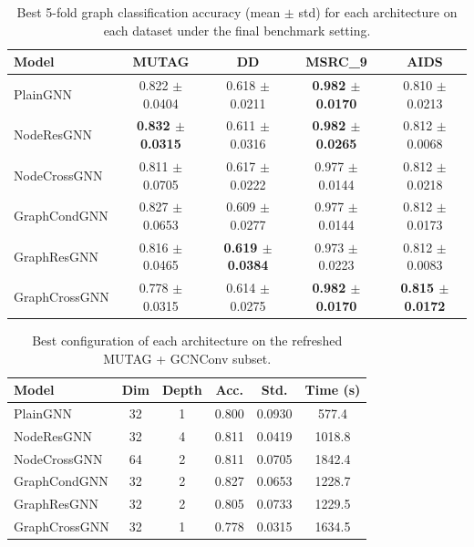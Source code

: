 \begin{table}[t]
\centering
\small
\setlength{\tabcolsep}{4pt}
\caption{Best 5-fold graph classification accuracy (mean $\pm$ std) for each architecture on each dataset under the final benchmark setting.}
\label{tab:main_results}
\begin{tabular}{lcccc}
\toprule
Model & MUTAG & DD & MSRC\_9 & AIDS \\
\midrule
PlainGNN & 0.822 $\pm$ 0.0404 & 0.618 $\pm$ 0.0211 & \textbf{0.982 $\pm$ 0.0170} & 0.810 $\pm$ 0.0213 \\
NodeResGNN & \textbf{0.832 $\pm$ 0.0315} & 0.611 $\pm$ 0.0316 & \textbf{0.982 $\pm$ 0.0265} & 0.812 $\pm$ 0.0068 \\
NodeCrossGNN & 0.811 $\pm$ 0.0705 & 0.617 $\pm$ 0.0222 & 0.977 $\pm$ 0.0144 & 0.812 $\pm$ 0.0218 \\
GraphCondGNN & 0.827 $\pm$ 0.0653 & 0.609 $\pm$ 0.0277 & 0.977 $\pm$ 0.0144 & 0.812 $\pm$ 0.0173 \\
GraphResGNN & 0.816 $\pm$ 0.0465 & \textbf{0.619 $\pm$ 0.0384} & 0.973 $\pm$ 0.0223 & 0.812 $\pm$ 0.0083 \\
GraphCrossGNN & 0.778 $\pm$ 0.0315 & 0.614 $\pm$ 0.0275 & \textbf{0.982 $\pm$ 0.0170} & \textbf{0.815 $\pm$ 0.0172} \\
\bottomrule
\end{tabular}
\end{table}

\begin{table}[t]
\centering
\small
\caption{Best configuration of each architecture on the refreshed MUTAG + GCNConv subset.}
\label{tab:ablation}
\begin{tabular}{lccccc}
\toprule
Model & Dim & Depth & Acc. & Std. & Time (s) \\
\midrule
PlainGNN & 32 & 1 & 0.800 & 0.0930 & 577.4 \\
NodeResGNN & 32 & 4 & 0.811 & 0.0419 & 1018.8 \\
NodeCrossGNN & 64 & 2 & 0.811 & 0.0705 & 1842.4 \\
GraphCondGNN & 32 & 2 & 0.827 & 0.0653 & 1228.7 \\
GraphResGNN & 32 & 2 & 0.805 & 0.0733 & 1229.5 \\
GraphCrossGNN & 32 & 1 & 0.778 & 0.0315 & 1634.5 \\
\bottomrule
\end{tabular}
\end{table}

